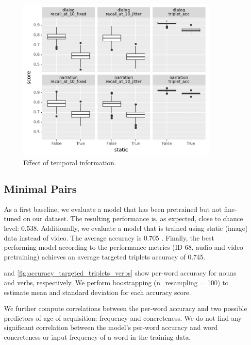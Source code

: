 \begin{figure}[htb]
  \centering
  \includegraphics[width=0.9\textwidth]{results/ablations/static.pdf}
  \caption{Effect of temporal information.}
  \label{fig:static}
\end{figure}


\subsection{Minimal Pairs}
As a first baseline, we evaluate a model that has been pretrained but not fine-tuned on our dataset. The resulting performance is, as expected, close to chance level: 0.538. Additionally, we evaluate a model that is trained using static (image) data instead of video. The average accuracy is 0.705 . Finally, the best performing model according to the
performance metrics (ID 68, audio and video pretraining) achieves an average
targeted triplets accuracy of 0.745.

 and
\ref{fig:accuracy_targeted_triplets_verbs} show per-word
accuracy for nouns and verbs, respectively. We perform boostrapping (n\_resampling = 100) to estimate mean and standard deviation for each accuracy score.

We further compute correlations between the per-word accuracy and two 
possible predictors of age of acquisition: frequency and concreteness. 
We do not find any significant correlation between the model's per-word 
accuracy and word concreteness or input frequency of a word in the 
training data.




